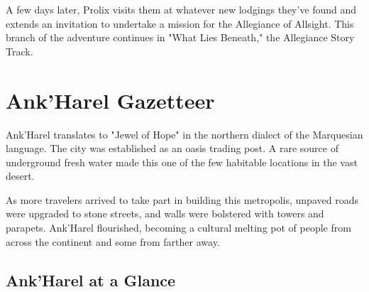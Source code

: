 \documentclass[10pt,a4paper,twoside,bg=print,twocolumn,openany,nodeprecatedcode]{dndbook}
\begin{document}
A few days later, Prolix visits them at whatever new lodgings they've found and extends an invitation to undertake a mission for the Allegiance of Allsight. This branch of the adventure continues in "What Lies Beneath," the Allegiance Story Track.

\section{Ank'Harel Gazetteer}
Ank'Harel translates to "Jewel of Hope" in the northern dialect of the Marquesian language. The city was established as an oasis trading post. A rare source of underground fresh water made this one of the few habitable locations in the vast desert.

As more travelers arrived to take part in building this metropolis, unpaved roads were upgraded to stone streets, and walls were bolstered with towers and parapets. Ank'Harel flourished, becoming a cultural melting pot of people from across the continent and some from farther away.

\subsection{Ank'Harel at a Glance}
\end{document}
